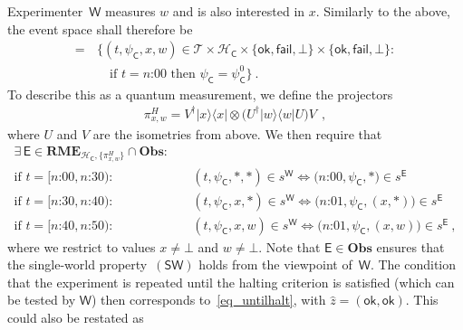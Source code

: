 \documentclass[12pt]{article}
\theoremstyle{plain}
\theoremstyle{definition}
\newcommand*{\cH}{\mathcal{H}}
\newcommand*{\cT}{\mathcal{T}}
\newcommand{\proj}[1]{|#1\rangle\!\langle #1|}
\newcommand*{\Exp}{\mathsf{E}}
\newcommand*{\Wigner}{\mathsf{W}}
\newcommand*{\Coin}{\mathsf{C}}
\newcommand*{\BOE}{\mathbf{Obs}}
\newcommand*{\RME}{\mathbf{RME}}
\newcommand*{\SW}{\mathsf{(SW)}}
\newcommand*{\ok}{\mathsf{ok}}
\newcommand*{\fail}{\mathsf{fail}}
\begin{document}
Experimenter~$\Wigner$ measures $w$ and is also interested in $x$. Similarly to the above, the event space shall therefore be
\begin{align}
      [\Wigner] = \, & \bigl\{(t, \psi_{\Coin}, x, w)  \in \cT \times \cH_\Coin \times \{\ok, \fail, \bot\} \times  \{\ok, \fail, \bot\} : \nonumber \\ & \quad \text{if } t = \text{$n$:00} \text{ then } \psi_{\Coin} = \psi_{\Coin}^0 \label{eq_Wignerpsi} \bigr\}  \ .
\end{align}
To describe this as a quantum measurement, we define the projectors
\begin{align*}
  \pi^{H}_{x, w} = V^{\dagger} \proj{x} \otimes \bigl(U^{\dagger} \proj{w} U \bigr) V \ \ ,
\end{align*}
where $U$ and $V$ are the isometries from above. We then require that 
  \begin{align} \label{eq_WignerM}
 \exists \,  \Exp \in \RME_{\cH_{\Coin}, \{\pi^H_{x, w}\}} \cap \BOE:  \\ 
 \text{if $t = [\text{$n$:00}, \text{$n$:30}$)} : & \quad  (t, \psi_\Coin, *, *) \in s^{\Wigner}  \iff \bigl(\text{$n$:00}, \psi_{\Coin}, * \bigr) \in s^{\Exp} \nonumber \\ 
    \text{if $t = [\text{$n$:30}, \text{$n$:40}$)} : & \quad  (t, \psi_\Coin, x, *) \in s^{\Wigner}  \iff \bigl(\text{$n$:01}, \psi_{\Coin}, (x,*) \bigr) \in s^{\Exp}  \nonumber \\
    \text{if $t = [\text{$n$:40}, \text{$n$:50}$)} : & \quad  (t, \psi_\Coin, x, w) \in s^{\Wigner}   \iff \bigl(\text{$n$:01}, \psi_{\Coin}, (x, w)\bigr) \in s^{\Exp} \ ,\nonumber 
\end{align}
where we restrict to values $x \neq \bot$ and $w \neq \bot$. 
Note that $\Exp \in \BOE$ ensures that the single-world property~$\SW$ holds from the viewpoint of~$\Wigner$. The condition that the experiment is repeated until the halting criterion  is satisfied (which can be tested by $\Wigner$) then corresponds to~\eqref{eq_untilhalt}, with $\hat{z} = (\ok, \ok)$. This could also be restated as
\end{document}
